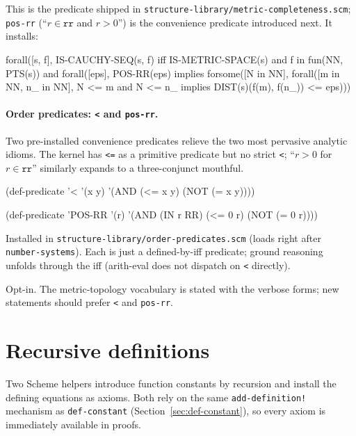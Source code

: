 \noindent
This is the predicate shipped in
\texttt{structure-library/metric-completeness.scm}; \texttt{pos-rr}
(``$r \in \mathtt{rr}$ and $r > 0$'') is the convenience predicate introduced
next.  It installs:
\begin{VNBsnip}
forall([s, f],
  IS-CAUCHY-SEQ(s, f) iff
    IS-METRIC-SPACE(s)
    and f in fun(NN, PTS(s))
    and forall([eps], POS-RR(eps) implies
          forsome([N in NN],
            forall([m in NN, n_ in NN], N <= m and N <= n_ implies
              DIST(s)(f(m), f(n_)) <= eps)))
\end{VNBsnip}

\paragraph{Order predicates: \texttt{<} and \texttt{pos-rr}.}  Two
pre-installed convenience predicates relieve the two most pervasive
analytic idioms.  The kernel has \texttt{<=} as a primitive predicate
but no strict \texttt{<}; ``$r > 0$ for $r \in \mathtt{rr}$'' similarly
expands to a three-conjunct mouthful.

\begin{VNBcode}
(def-predicate '< '(x y)
  '(AND (<= x y) (NOT (= x y))))

(def-predicate 'POS-RR '(r)
  '(AND (IN r RR) (<= 0 r) (NOT (= 0 r))))
\end{VNBcode}

Installed in \texttt{structure-library/order-predicates.scm} (loads
right after \texttt{number-systems}).  Each is just a defined-by-iff
predicate; ground reasoning unfolds through the iff (arith-eval
does not dispatch on \texttt{<} directly).

\begin{remark}
Opt-in.  The metric-topology vocabulary is stated with the
verbose forms; new statements should prefer \texttt{<} and
\texttt{pos-rr}.
\end{remark}

\section{Recursive definitions}
\label{sec:recursive-defs}

Two Scheme helpers introduce function constants by recursion and install
the defining equations as axioms.  Both rely on the same
\texttt{add-definition!} mechanism as \texttt{def-constant}
(Section~\ref{sec:def-constant}), so every axiom is immediately
available in proofs.

